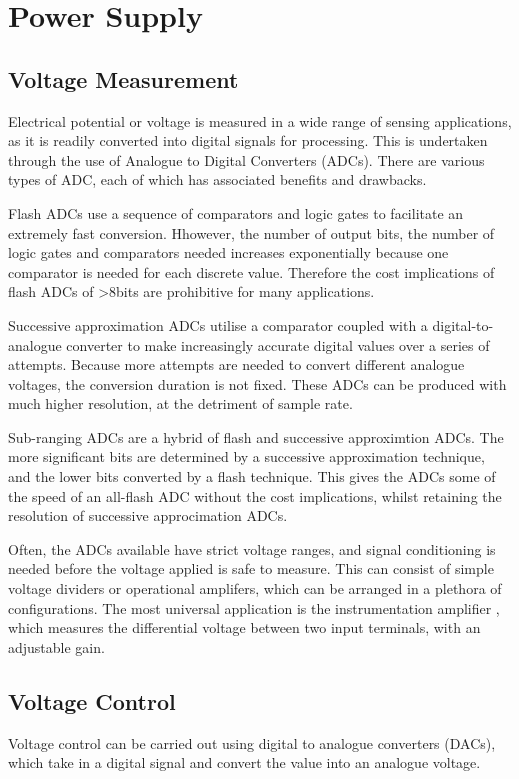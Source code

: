 \section{Power Supply}
\subsection{Voltage Measurement}\label{volt-meas}
Electrical potential or voltage is measured in a wide range of sensing applications, as it is readily converted into digital signals for processing. This is undertaken through the use of Analogue to Digital Converters (ADCs). There are various types of ADC, each of which has associated benefits and drawbacks.

Flash ADCs use a sequence of comparators and logic gates to facilitate an extremely fast conversion. Hhowever, the number of output bits, the number of logic gates and comparators needed increases exponentially because one comparator is needed for each discrete value. Therefore the cost implications of flash ADCs of >8bits are prohibitive for many applications.

Successive approximation ADCs utilise a comparator coupled with a digital-to-analogue converter to make increasingly accurate digital values over a series of attempts. Because more attempts are needed to convert different analogue voltages, the conversion duration is not fixed. These ADCs can be produced with much higher resolution, at the detriment of sample rate.

Sub-ranging ADCs are a hybrid of flash and successive approximtion ADCs. The more significant bits are determined by a successive approximation technique, and the lower bits converted by a flash technique. This gives the ADCs some of the speed of an all-flash ADC without the cost implications, whilst retaining the resolution of successive approcimation ADCs.

Often, the ADCs available have strict voltage ranges, and signal conditioning is needed before the voltage applied is safe to measure. This can consist of simple voltage dividers or operational amplifers, which can be arranged in a plethora of configurations. The most universal application is the instrumentation amplifier \cite{instr-amp}, which measures the differential voltage between two input terminals, with an adjustable gain.


\subsection{Voltage Control}
Voltage control can be carried out using digital to analogue converters (DACs), which take in a digital signal and convert the value into an analogue voltage. 

